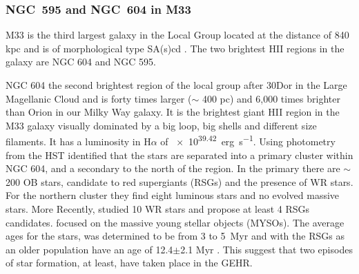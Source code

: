 \documentclass[fleqn,usenatbib, useAMS, a4paper]{mnras}
\newcommand\ha{\ensuremath{\text{H}\alpha}}
\begin{document}

\subsubsection{NGC~595 and NGC~604 in M33}
\label{sec:m33-ngc}

M33 is the third largest galaxy in the Local Group located at the distance of 840 kpc and is of morphological type SA(s)cd \citep{2015KamKinematics}.
The two brightest HII regions in the galaxy are NGC 604 and NGC 595.

NGC 604 the second brightest region of the local group after 30Dor in the Large Magellanic Cloud and is forty times larger ($\sim $ 400 pc) and 6,000 times brighter than Orion in our Milky Way galaxy.
It is the brightest giant HII region in the M33 galaxy visually dominated by a big loop, big shells and different size filaments.
It has a luminosity in \ha{} of \SI{e39.42}{erg.s^{-1}}\citep{2002MNRAS.329..481B}.
Using photometry from the HST \citet{1996ApJ...456..174H} identified that the stars are separated into a primary cluster within NGC 604, and a secondary to the north of the region.
In the primary there are \(\sim\)200 OB stars, candidate to red supergiants (RSGs) and the presence of WR stars.
For the northern cluster they find eight luminous stars and no evolved massive stars.
More Recently, \citet{2011MNRAS.411..235E} studied 10 WR stars and propose at least 4 RSGs candidates.
\citet{2012AJ....143...43F} focused on the massive young stellar objects (MYSOs).
The average ages for the stars, was determined to be from  \num{3} to \SI{5}{Myr} \citep{1996ApJ...456..174H} and with the RSGs as an older population have an age of 12.4\(\pm\)2.1 Myr \citep{2011MNRAS.411..235E}.
This suggest that two episodes of star formation, at least, have taken place in the GEHR.

\end{document}
